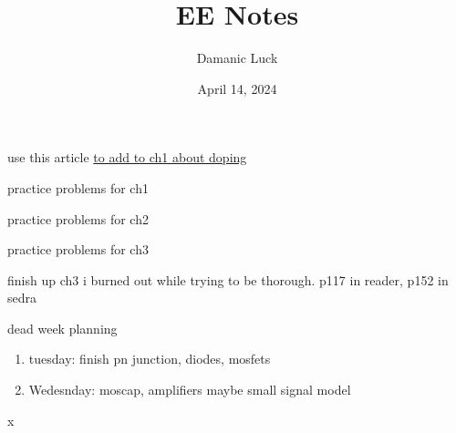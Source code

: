 \documentclass[10pt, openany]{book}
\title{EE Notes}
\author{Damanic Luck}
\date{April 14, 2024}
\begin{document}



\tableofcontents
\begin{todo}
    \item use this article \href{http://home.iitj.ac.in/~sptiwari/EE314/Lecture2_Semi_Basics_Junction.pdf}{to add to ch1 about doping}
    \item practice problems for ch1
    \item practice problems for ch2
    \item practice problems for ch3
    \item finish up ch3 i burned out while trying to be thorough. p117 in reader, p152 in sedra
    \item dead week planning
    \begin{enumerate}
        \item tuesday: finish pn junction, diodes, mosfets
        \item Wedesnday: moscap, amplifiers maybe small signal model
    \end{enumerate}x
\end{todo}

\newpage


\newpage


\newpage


\newpage

\end{document}
